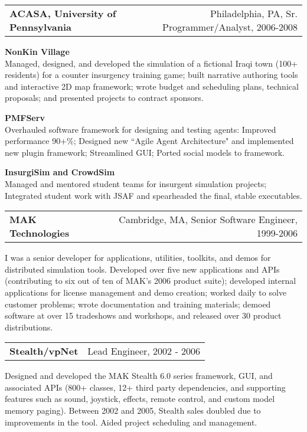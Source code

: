 \medskip

\needspace{6em}
\begin{tabular*}{7.1in}{@{}l@{\extracolsep\fill}r}
{\large {\bf ACASA, University of Pennsylvania}} & Philadelphia, PA, Sr. Programmer/Analyst, 2006-2008\\
\end{tabular*}

{\bf NonKin Village}\\
Managed, designed, and developed the simulation of a fictional Iraqi town (100+ residents) for a counter insurgency training game; built narrative authoring tools and interactive 2D map framework; wrote budget and scheduling plans, technical proposals; and presented projects to contract sponsors.

{\bf PMFServ}\\
Overhauled software framework for designing and testing agents: Improved performance 90+\%; Designed new ``Agile Agent Architecture" and implemented new plugin framework; Streamlined GUI; Ported social models to framework.

{\bf InsurgiSim and CrowdSim}\\
Managed and mentored student teams for insurgent simulation projects; Integrated student work with JSAF and spearheaded the final, stable executables. 

\medskip
\medskip

\needspace{6em}
\begin{tabular*}{7.1in}{@{}l@{\extracolsep\fill}r}
{\large {\bf MAK Technologies}} & Cambridge, MA, Senior Software Engineer, 1999-2006\\
\end{tabular*}

I was a senior developer for applications, utilities, toolkits, and demos for distributed simulation tools.  Developed over five new applications and APIs (contributing to six out of ten of MAK's 2006 product suite); developed internal applications for license management and demo creation; worked daily to solve customer problems; wrote documentation and training materials; demoed software at over 15 tradeshows and workshops, and released over 30 product distributions. 

\medskip
\needspace{6em}
\begin{tabular*}{7.1in}{@{}l@{\extracolsep\fill}r}
{\bf Stealth/vpNet} & Lead Engineer, 2002 - 2006\\
\end{tabular*}
Designed and developed the MAK Stealth 6.0 series framework, GUI, and associated APIs (800+ classes, 12+ third party dependencies, and supporting features such as sound, joystick, effects, remote control, and custom model memory paging).  Between 2002 and 2005, Stealth sales doubled due to improvements in the tool. Aided project scheduling and management.

